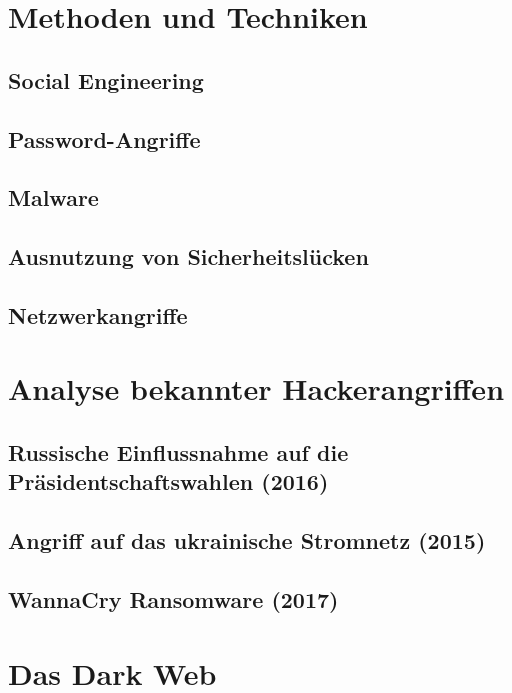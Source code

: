 \documentclass[11pt, a4paper]{article}
\begin{document}
\section{Methoden und Techniken}\label{methoden-und-techniken}

\subsection{Social Engineering}

\subsection{Password-Angriffe}

\subsection{Malware}


\subsection{Ausnutzung von Sicherheitslücken}

\subsection{Netzwerkangriffe}


\section{Analyse bekannter Hackerangriffen}

\subsection{Russische Einflussnahme auf die Präsidentschaftswahlen (2016)}

\subsection{Angriff auf das ukrainische Stromnetz (2015)}

\subsection{WannaCry Ransomware (2017)}


\section{Das Dark Web}
\end{document}
